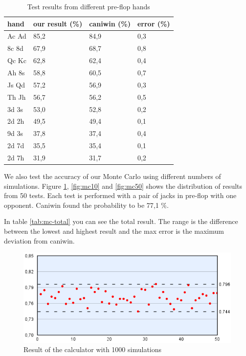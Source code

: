 \vspace{4mm}
\begin{table}
  \center
  \begin{tabular}{ | l | l | l | l | }
  	\hline
  	hand & our result (\%) & caniwin (\%) & error (\%) \\
  	\hline                       
    Ac Ad & 85,2 & 84,9 & 0,3 \\
    8c 8d & 67,9 & 68,7 & 0,8 \\
    Qc Kc & 62,8 & 62,4 & 0,4 \\
    Ah 8s & 58,8 & 60,5 & 0,7 \\
    Js Qd & 57,2 & 56,9 & 0,3 \\
    Th Jh & 56,7 & 56,2 & 0,5 \\
    3d 3s & 53,0 & 52,8 & 0,2 \\
    2d 2h & 49,5 & 49,4 & 0,1 \\
    9d 3s & 37,8 & 37,4 & 0,4 \\
    2d 7d & 35,5 & 35,4 & 0,1 \\
    2d 7h & 31,9 & 31,7 & 0,2 \\
  	\hline   	
  \end{tabular}
  \caption{Test results from different pre-flop hands \label{tab:pre-flop-test}}
\end{table}
\vspace{4mm}

We also test the accuracy of our Monte Carlo using different numbers of simulations. Figure \ref{fig:mc1}, \ref{fig:mc10} and \ref{fig:mc50} shows the distribution of results from 50 tests. Each test is performed with a pair of jacks in pre-flop with one opponent. Caniwin found the probability to be 77,1 \%. 

In table \ref{tab:mc-total} you can see the total result. The range is the difference between the lowest and highest result and the max error is the maximum deviation from caniwin. 

\begin{figure}
  \center
    \includegraphics[scale=0.775]{images/MonteCarlo/1k.png}
  \caption{Result of the calculator with 1000 simulations \label{fig:mc1}}
\end{figure}

